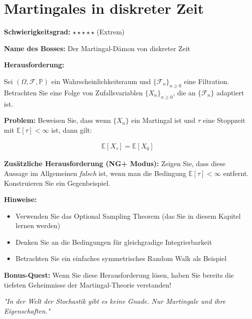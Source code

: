 \chapter{Martingales in diskreter Zeit}

\begin{bosschallenge}
\textbf{Schwierigkeitsgrad:} $\star\star\star\star\star$ (Extrem)

\textbf{Name des Bosses:} Der Martingal-Dämon von diskreter Zeit

\textbf{Herausforderung:}

Sei $(\Omega, \mathcal{F}, \mathbb{P})$ ein Wahrscheinlichkeitsraum und $\{\mathcal{F}_n\}_{n \geq 0}$ eine Filtration. Betrachten Sie eine Folge von Zufallsvariablen $\{X_n\}_{n \geq 0}$, die an $\{\mathcal{F}_n\}$ adaptiert ist.

\textbf{Problem:} Beweisen Sie, dass wenn $\{X_n\}$ ein Martingal ist und $\tau$ eine Stoppzeit mit $\mathbb{E}[\tau] < \infty$ ist, dann gilt:

\begin{align}
\mathbb{E}[X_\tau] = \mathbb{E}[X_0]
\end{align}

\textbf{Zusätzliche Herausforderung (NG+ Modus):} Zeigen Sie, dass diese Aussage im Allgemeinen \textit{falsch} ist, wenn man die Bedingung $\mathbb{E}[\tau] < \infty$ entfernt. Konstruieren Sie ein Gegenbeispiel.

\textbf{Hinweise:}
\begin{itemize}
    \item Verwenden Sie das Optional Sampling Theorem (das Sie in diesem Kapitel lernen werden)
    \item Denken Sie an die Bedingungen für gleichgradige Integrierbarkeit
    \item Betrachten Sie ein einfaches symmetrisches Random Walk als Beispiel
\end{itemize}

\textbf{Bonus-Quest:} Wenn Sie diese Herausforderung lösen, haben Sie bereits die tiefsten Geheimnisse der Martingal-Theorie verstanden!

\vspace{0.5cm}
\textit{"In der Welt der Stochastik gibt es keine Gnade. Nur Martingale und ihre Eigenschaften."}
\end{bosschallenge}

